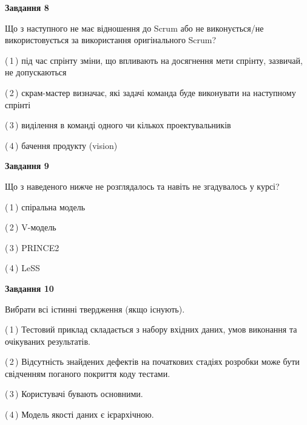 \documentclass[10pt, ukrainian]{article}
\begin{document}
{\begin {large}
{\begin {center}\textbf{Завдання 8}\end {center}}\par
Що з наступного не має відношення до Scrum або не виконується/не використовується за використання оригінального Scrum?\par
\vspace{2mm}



(\,1\,) під час спрінту зміни, що впливають на досягнення мети спрінту, зазвичай, не допускаються%



(\,2\,) скрам-мастер визначає, які задачі команда буде виконувати на наступному спрінті%



(\,3\,) виділення в команді одного чи кількох проектувальників%



(\,4\,) бачення продукту (vision) %


{\begin {center}\textbf{Завдання 9}\end {center}}\par
Що з наведеного нижче не розглядалось та навіть не згадувалось у курсі?\par
\vspace{2mm}



(\,1\,) спіральна модель%



(\,2\,) V-модель%



(\,3\,) PRINCE2%



(\,4\,) LeSS%


{\begin {center}\textbf{Завдання 10}\end {center}}\par
Вибрати всі істинні твердження (якщо існують).\par
\vspace{2mm}



(\,1\,) Тестовий приклад складається з набору вхідних даних, умов виконання та очікуваних результатів.%



(\,2\,) Відсутність знайдених дефектів на початкових стадіях розробки може бути свідченням поганого покриття коду тестами.%



(\,3\,) Користувачі бувають основними.%



(\,4\,) Модель якості даних є ієрархічною.%



\end {large}}
\end{document}
